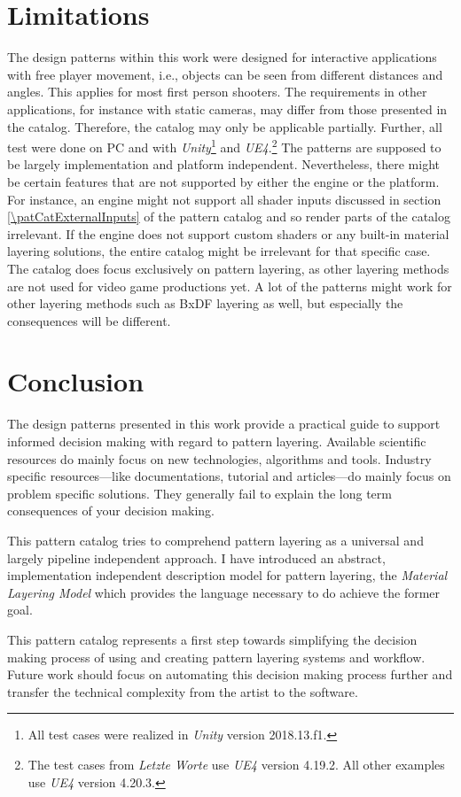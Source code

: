 \section{Limitations}
The design patterns within this work were designed for interactive applications with free player movement, i.e., objects can be seen from different distances and angles. This applies for most first person shooters. The requirements in other applications, for instance with static cameras, may differ from those presented in the catalog. Therefore, the catalog may only be applicable  partially. Further, all test were done on PC and with \emph{Unity}\footnote{All test cases  were realized in \emph{Unity} version 2018.13.f1.} and \emph{UE4}.\footnote{The test cases from \emph{Letzte Worte} use \emph{UE4} version 4.19.2. All other examples use \emph{UE4} version 4.20.3.} The patterns are supposed to be largely implementation and platform independent. Nevertheless, there might be certain features that are not supported by either the engine or the platform. For instance, an engine might not support all shader inputs discussed in section \ref{\patCatExternalInputs} of the pattern catalog and so render parts of the catalog irrelevant. If the engine does not support custom shaders or any built-in material layering solutions, the entire catalog might be irrelevant for that specific case. The catalog does focus exclusively on pattern layering, as other layering methods are not used for video game productions yet. A lot of the patterns might work for other layering methods such as BxDF layering as well, but especially the consequences will be different.  

\section{Conclusion}\label{sec:conclussion}
 
The design patterns presented in this work provide a practical guide to support informed decision making with regard to pattern layering. Available scientific resources do mainly focus on new technologies, algorithms and tools. Industry specific resources---like documentations, tutorial and articles---do mainly focus on problem specific solutions. They generally fail to explain the long term consequences of your decision making.
 
This pattern catalog tries to comprehend pattern layering as a universal and largely pipeline independent approach. I have introduced an abstract, implementation independent description model for pattern layering, the \emph{Material Layering Model} which provides the language necessary to do achieve the former goal.

This pattern catalog represents a first step towards simplifying the decision making process of using and creating pattern layering systems and workflow. Future work should focus on automating this decision making process further and transfer the technical complexity from the artist to the software.



  